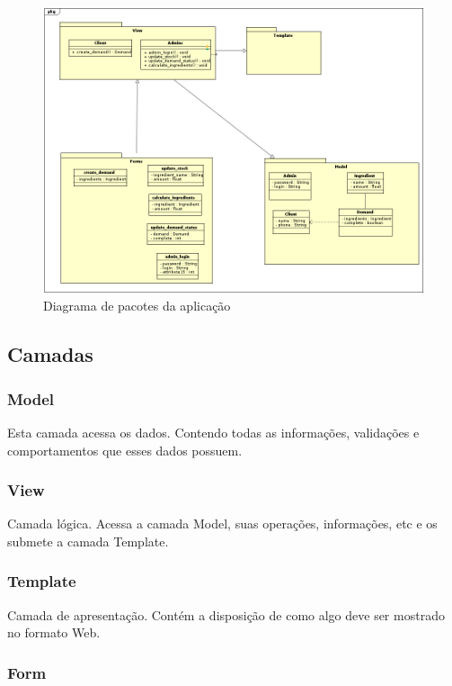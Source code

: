 \begin{figure}[h!]
	\centering
	\includegraphics[width=\textwidth]{figuras/pacote.png}
	\caption{Diagrama de pacotes da aplicação}
	\label{fig:pacote}
\end{figure}

\subsection{Camadas}
\subsubsection{Model}

Esta camada acessa os dados. Contendo todas as informações, validações e comportamentos que esses dados possuem.

\subsubsection{View}

Camada lógica. Acessa a camada Model, suas operações, informações, etc e os submete a camada Template.

\subsubsection{Template}

Camada  de apresentação. Contém a disposição de como algo deve ser mostrado no formato Web.

\subsubsection{Form}

